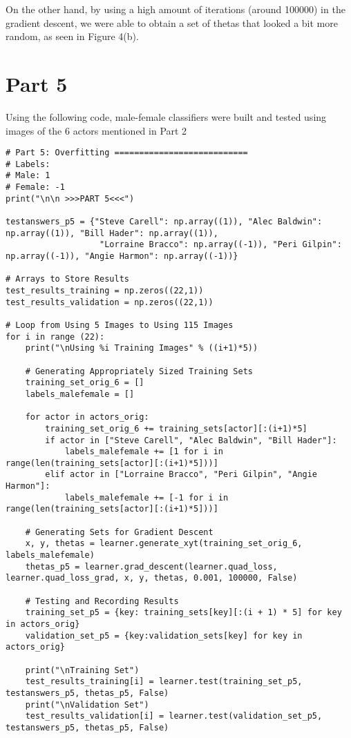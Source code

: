 \documentclass[11pt,a4paper]{report}
\begin{document}
On the other hand, by using a high amount of iterations (around 100000) in the gradient descent, we were able to obtain a set of thetas that looked a bit more random, as seen in Figure 4(b).

\newpage
\section*{Part 5}
Using the following code, male-female classifiers were built and tested using images of the 6 actors mentioned in Part 2

\begin{lstlisting}
# Part 5: Overfitting ===========================
# Labels:
# Male: 1
# Female: -1
print("\n\n >>>PART 5<<<")

testanswers_p5 = {"Steve Carell": np.array((1)), "Alec Baldwin": np.array((1)), "Bill Hader": np.array((1)),
                   "Lorraine Bracco": np.array((-1)), "Peri Gilpin": np.array((-1)), "Angie Harmon": np.array((-1))}

# Arrays to Store Results
test_results_training = np.zeros((22,1))
test_results_validation = np.zeros((22,1))

# Loop from Using 5 Images to Using 115 Images
for i in range (22):
    print("\nUsing %i Training Images" % ((i+1)*5))

    # Generating Appropriately Sized Training Sets
    training_set_orig_6 = []
    labels_malefemale = []

    for actor in actors_orig:
        training_set_orig_6 += training_sets[actor][:(i+1)*5]
        if actor in ["Steve Carell", "Alec Baldwin", "Bill Hader"]:
            labels_malefemale += [1 for i in range(len(training_sets[actor][:(i+1)*5]))]
        elif actor in ["Lorraine Bracco", "Peri Gilpin", "Angie Harmon"]:
            labels_malefemale += [-1 for i in range(len(training_sets[actor][:(i+1)*5]))]

    # Generating Sets for Gradient Descent
    x, y, thetas = learner.generate_xyt(training_set_orig_6, labels_malefemale)
    thetas_p5 = learner.grad_descent(learner.quad_loss, learner.quad_loss_grad, x, y, thetas, 0.001, 100000, False)

    # Testing and Recording Results
    training_set_p5 = {key: training_sets[key][:(i + 1) * 5] for key in actors_orig}
    validation_set_p5 = {key:validation_sets[key] for key in actors_orig}

    print("\nTraining Set")
    test_results_training[i] = learner.test(training_set_p5, testanswers_p5, thetas_p5, False)
    print("\nValidation Set")
    test_results_validation[i] = learner.test(validation_set_p5, testanswers_p5, thetas_p5, False)


\end{lstlisting}
\end{document}
